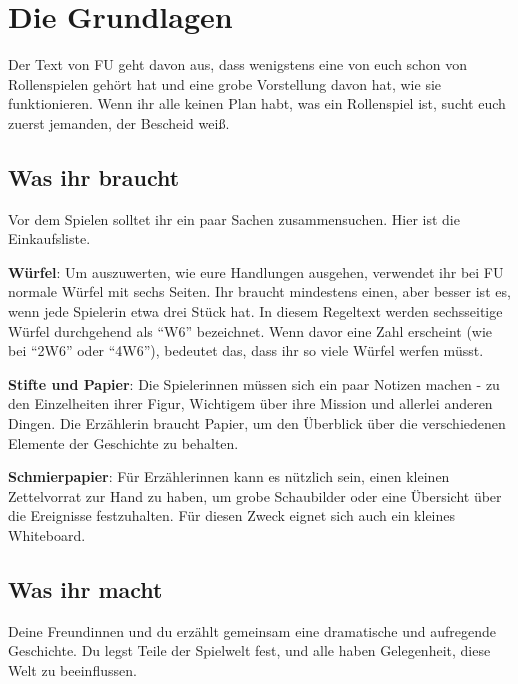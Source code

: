 \section{Die Grundlagen}\label{die-grundlagen}
\begin{multicols}{2}
Der Text von FU geht davon aus, dass wenigstens eine von euch schon von
Rollenspielen gehört hat und eine grobe Vorstellung davon hat, wie sie
funktionieren. Wenn ihr alle keinen Plan habt, was ein Rollenspiel ist,
sucht euch zuerst jemanden, der Bescheid weiß.

\subsection{Was ihr braucht}\label{was-ihr-braucht}
Vor dem Spielen solltet ihr ein paar Sachen zusammensuchen. Hier ist die
Einkaufsliste.

\textbf{Würfel}: Um auszuwerten, wie eure Handlungen ausgehen, verwendet
ihr bei FU normale Würfel mit sechs Seiten. Ihr braucht mindestens
einen, aber besser ist es, wenn jede Spielerin etwa drei Stück hat. In
diesem Regeltext werden sechsseitige Würfel durchgehend als ``W6''
bezeichnet. Wenn davor eine Zahl erscheint (wie bei ``2W6'' oder
``4W6''), bedeutet das, dass ihr so viele Würfel werfen müsst.

\textbf{Stifte und Papier}: Die Spielerinnen müssen sich ein paar
Notizen machen - zu den Einzelheiten ihrer Figur, Wichtigem über ihre
Mission und allerlei anderen Dingen. Die Erzählerin braucht Papier, um
den Überblick über die verschiedenen Elemente der Geschichte zu
behalten.

\textbf{Schmierpapier}: Für Erzählerinnen kann es nützlich sein, einen
kleinen Zettelvorrat zur Hand zu haben, um grobe Schaubilder oder eine
Übersicht über die Ereignisse festzuhalten. Für diesen Zweck eignet sich
auch ein kleines Whiteboard.
\subsection{Was ihr macht}\label{was-ihr-macht}

Deine Freundinnen und du erzählt gemeinsam eine dramatische und
aufregende Geschichte. Du legst Teile der Spielwelt fest, und alle haben
Gelegenheit, diese Welt zu beeinflussen.


\end{multicols}
